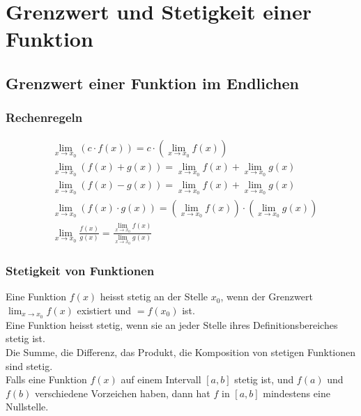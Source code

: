 \section{Grenzwert und Stetigkeit einer Funktion}
\subsection{Grenzwert einer Funktion im Endlichen}
\subsubsection{Rechenregeln}
\begin{align*}
    &\lim_{x \to x_0} (c \cdot f(x)) = c \cdot (\lim_{x \to x_0} f(x)) \\
    &\lim_{x \to x_0}(f(x)+g(x)) = \lim_{x \to x_0}f(x) + \lim_{x \to x_0} g(x) \\
    &\lim_{x \to x_0} (f(x)-g(x)) = \lim_{x \to x_0} f(x) + \lim_{x \to x_0} g(x) \\
    &\lim_{x \to x_0} (f(x) \cdot g(x)) = (\lim_{x \to x_0} f(x)) \cdot (\lim_{x \to x_0} g(x)) \\
    &\lim_{x \to x_0} \frac{f(x)}{g(x)} = \frac{\lim_{x \to x_0} f(x)}{\lim_{x \to x_0} g(x)}
\end{align*}

\subsubsection{Stetigkeit von Funktionen}
Eine Funktion $f(x)$ heisst stetig an der Stelle $x_0$, wenn der Grenzwert $\lim_{x \to x_0} f(x)$ existiert und $= f(x_0)$ ist. \\
Eine Funktion heisst stetig, wenn sie an jeder Stelle ihres Definitionsbereiches stetig ist. \\
Die Summe, die Differenz, das Produkt, die Komposition von stetigen Funktionen sind stetig.
\\
Falls eine Funktion $f(x)$ auf einem Intervall $[a,b]$ stetig ist, und $f(a)$ und $f(b)$ verschiedene Vorzeichen haben, dann hat $f$ in $[a,b]$ mindestens eine Nullstelle.
